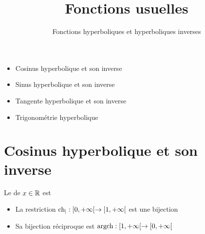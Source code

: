 





\title{{\bf Fonctions usuelles}}
\subtitle{Fonctions hyperboliques et hyperboliques inverses}




\begin{frame}
  
  \debutmontitre

  \pause

{\footnotesize
\hfill
{}
\begin{minipage}{0.6\textwidth}
  \begin{itemize}
    \item<3-> Cosinus hyperbolique et son inverse
    \item<4-> Sinus hyperbolique et son inverse
    \item<5-> Tangente hyperbolique et son inverse
    \item<6-> Trigonométrie hyperbolique
  \end{itemize}
\end{minipage}
}

\end{frame}
\setcounter{framenumber}{0}



\section{Cosinus hyperbolique et son inverse}

\begin{frame}

Le  de $x\in \mathbb{R}$ est 
\pause  
\bigskip
\begin{itemize}
  \item La restriction $\mathop{\text{ch}}\nolimits_| : [0,+\infty[ \to [1,+\infty[$ est une bijection
\pause  
  \item Sa bijection réciproque est $\mathop{\text{argch}}\nolimits : [1,+\infty[ \to [0,+\infty[$
\end{itemize}

\pause  
{}
\end{frame}



